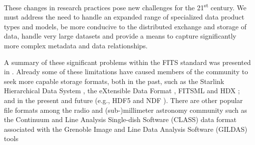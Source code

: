 \documentclass[final,authoryear,5p,times,twocolumn]{elsarticle}
\begin{document}
These changes in research practices pose new challenges for the
21\textsuperscript{st} century. We must address the need to handle an
expanded range of specialized data product types and models, be more
conducive to the distributed exchange and storage of data, handle very
large datasets and provide a means to capture significantly more complex
metadata and data relationships.


A summary of these significant problems within the FITS standard was
presented in \citet{P90_adassxxiii}.  Already some of these limitations
have caused members of the community to seek more capable storage
formats, both in the past, such as the Starlink Hierarchical Data System
\citep[HDS;][]{1982QJRAS..23..485D}, the eXtensible Data Format
\citep[XDF;][]{2001ASPC..238..217S}, FITSML \citep{2001ASPC..238..487T}
and HDX \citep{2003ASPC..295..221G}; and in the present and future
(e.g., HDF5 \citep{2011ASPC..442...53A} and NDF \citep{2014Jenness}).
There are other popular file formats among the
radio and (sub-)millimeter astronomy community such as the Continuum and
Line Analysis Single-dish Software (CLASS) data format associated with
the Grenoble Image and Line Data Analysis Software (GILDAS) tools
\end{document}
